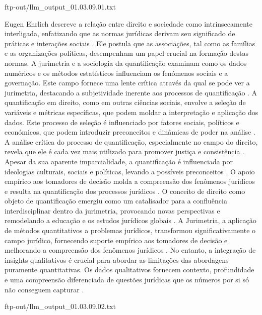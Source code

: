 \begin{agradecimentos}
    ftp-out/llm_output_01.03.09.01.txt 
    
    Eugen Ehrlich descreve a relação entre direito e sociedade como intrinsecamente interligada, enfatizando que as normas jurídicas derivam seu significado de práticas e interações sociais \cite{venturini2024}. Ele postula que as associações, tal como as famílias e as organizações políticas, desempenham um papel crucial na formação destas normas. A jurimetria e a sociologia da quantificação examinam como os dados numéricos e os métodos estatísticos influenciam os fenómenos sociais e a governação. Este campo fornece uma lente crítica através da qual se pode ver a jurimetria, destacando a subjetividade inerente aos processos de quantificação \cite{salais2016}. A quantificação em direito, como em outras ciências sociais, envolve a seleção de variáveis e métricas específicas, que podem moldar a interpretação e aplicação dos dados. Este processo de seleção é influenciado por fatores sociais, políticos e económicos, que podem introduzir preconceitos e dinâmicas de poder na análise \cite{salais2016}. A análise crítica do processo de quantificação, especialmente no campo do direito, revela que ele é cada vez mais utilizado para promover justiça e consistência \cite{10.1057/s41599-020-00557-0,de2010jurimetrics}. Apesar da sua aparente imparcialidade, a quantificação é influenciada por ideologias culturais, sociais e políticas, levando a possíveis preconceitos \cite{ccdacdfbcdaf,efbfffafaacadd}. O apoio empírico aos tomadores de decisão molda a compreensão dos fenômenos jurídicos e resulta na quantificação dos processos jurídicos \cite{ccdacdfbcdaf,efbfffafaacadd}. O conceito de direito como objeto de quantificação emergiu como um catalisador para a confluência interdisciplinar dentro da jurimetria, provocando novas perspectivas e remodelando a educação e os estudos jurídicos globais \cite{losano2006}. A Jurimetria, a aplicação de métodos quantitativos a problemas jurídicos, transformou significativamente o campo jurídico, fornecendo suporte empírico aos tomadores de decisão e melhorando a compreensão dos fenômenos jurídicos \cite{10.3390/fi9040068,10.5040/9781350220645,de2010jurimetrics}. No entanto, a integração de insights qualitativos é crucial para abordar as limitações das abordagens puramente quantitativas. Os dados qualitativos fornecem contexto, profundidade e uma compreensão diferenciada de questões jurídicas que os números por si só não conseguem capturar \cite{10.1590/dados.2022.65.3.267,10.1057/s41599-020-00557-0}. 
    
    ftp-out/llm_output_01.03.09.02.txt 
    

\end{agradecimentos}
